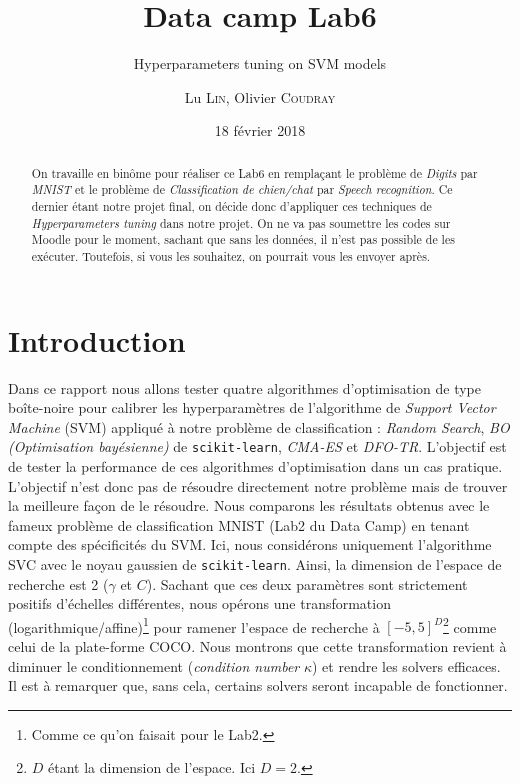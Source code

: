 \documentclass[12 pt, a4paper]{article}
\title[Data camp 2018]{Data camp Lab6}
\subtitle{Hyperparameters tuning on SVM models}
\author{Lu \textsc{Lin}, Olivier \textsc{Coudray}}
\date{18 février 2018}
\begin{document}
\maketitle




\begin{abstract}
On travaille en binôme pour réaliser ce Lab6 en remplaçant le problème de \textit{Digits} par \textit{MNIST} et le problème de \textit{Classification de chien/chat} par \textit{Speech recognition}. Ce dernier étant notre projet final, on décide donc d'appliquer ces techniques de \textit{Hyperparameters tuning} dans notre projet. On ne va pas soumettre les codes sur Moodle pour le moment, sachant que sans les données, il n'est pas possible de les exécuter. Toutefois, si vous les souhaitez, on pourrait vous les envoyer après.

\end{abstract}

\section{Introduction}
Dans ce rapport nous allons tester quatre algorithmes d'optimisation de type boîte-noire pour calibrer les hyperparamètres de l'algorithme de \textit{Support Vector Machine} (SVM) appliqué à notre problème de classification : \textit{Random Search}, \textit{BO (Optimisation bayésienne)} de \texttt{scikit-learn}, \textit{CMA-ES} et \textit{DFO-TR}. L'objectif est de tester la performance de ces algorithmes d'optimisation dans un cas pratique. L'objectif n'est donc pas de résoudre directement notre problème mais de trouver la meilleure façon de le résoudre. Nous comparons les résultats obtenus avec le fameux problème de classification MNIST (Lab2 du Data Camp) en tenant compte des spécificités du SVM. Ici, nous considérons uniquement l'algorithme SVC avec le noyau gaussien de \texttt{scikit-learn}. Ainsi, la dimension de l'espace de recherche est 2 ($\gamma$ et $C$). Sachant que ces deux paramètres sont strictement positifs d'échelles différentes, nous opérons une transformation (logarithmique/affine)\footnote{Comme ce qu'on faisait pour le Lab2.} pour ramener l'espace de recherche à $[-5, 5]^{D}$\footnote{$D$ étant la dimension de l'espace. Ici $D=2$.} comme celui de la plate-forme COCO. Nous montrons que cette transformation revient à diminuer le conditionnement (\textit{condition number} $\kappa$) et rendre les solvers efficaces. Il est à remarquer que, sans cela, certains solvers seront incapable de fonctionner.
\end{document}
